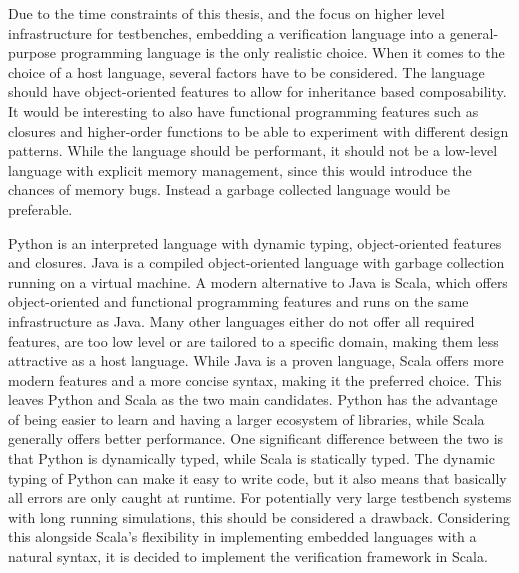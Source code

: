 Due to the time constraints of this thesis, and the focus on higher level infrastructure for testbenches, embedding a
verification language into a general-purpose programming language is the only realistic choice. When it comes to the
choice of a host language, several factors have to be considered. The language should have object-oriented features
to allow for inheritance based composability. It would be interesting to also have functional programming features
such as closures and higher-order functions to be able to experiment with different design patterns. While the
language should be performant, it should not be a low-level language with explicit memory management, since this
would introduce the chances of memory bugs. Instead a garbage collected language would be preferable.

Python is an interpreted language with dynamic typing, object-oriented features and closures. Java is a compiled
object-oriented language with garbage collection running on a virtual machine. A modern alternative to Java is Scala,
which offers object-oriented and functional programming features and runs on the same infrastructure as Java. Many
other languages either do not offer all required features, are too low level or are tailored to a specific domain,
making them less attractive as a host language. While Java is a proven language, Scala offers more modern features
and a more concise syntax, making it the preferred choice. This leaves Python and Scala as the two main candidates.
Python has the advantage of being easier to learn and having a larger ecosystem of libraries, while Scala generally
offers better performance. One significant difference between the two is that Python is dynamically typed, while
Scala is statically typed. The dynamic typing of Python can make it easy to write code, but it also means that
basically all errors are only caught at runtime. For potentially very large testbench systems with long running
simulations, this should be considered a drawback. Considering this alongside Scala's flexibility in implementing
embedded languages with a natural syntax, it is decided to implement the verification framework in Scala.

